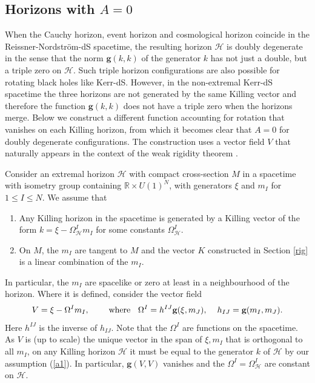 \documentclass[11pt, reqno]{amsart}
\newcommand{\R}{\mathbb{R}}
\theoremstyle{plain}
\theoremstyle{definition}
\numberwithin{equation}{section}
\begin{document}
\subsection{Horizons with \texorpdfstring{$A = 0$}{A = 0}}\label{ddhsec} When the Cauchy horizon, event horizon and cosmological horizon coincide in the Reissner-Nordström-dS spacetime, the resulting horizon $\mathcal{H}$ is doubly degenerate in the sense that the norm $\textbf{g}(k,k)$ of the generator $k$ has not just a double, but a triple zero on $\mathcal{H}$. Such triple horizon configurations are also possible for rotating black holes like Kerr-dS. However, in the non-extremal Kerr-dS spacetime the three horizons are not generated by the same Killing vector and therefore the function $\textbf{g}(k,k)$ does not have a triple zero when the horizons merge. Below we construct a different function accounting for rotation that vanishes on each Killing horizon, from which it becomes clear that $A = 0$ for doubly degenerate configurations. The construction uses a vector field $V$ that naturally appears in the context of the weak rigidity theorem \cite{C69, H96,CC08}.


Consider an extremal horizon $\mathcal{H}$ with compact cross-section $M$ in a spacetime with isometry group containing $\R \times U(1)^N$,  with generators $\xi$ and  $m_I$ for  $1 \leq I \leq N$. We assume that 
\begin{enumerate}
 \renewcommand{\labelenumi}{(A\arabic{enumi})}
  \renewcommand{\theenumi}{A\arabic{enumi}}
    \item Any Killing horizon in the spacetime is generated by a Killing vector of the form $k = \xi - \Omega^I_{\mathcal{H}}m_I$ for some constants $\Omega^I_{\mathcal{H}}$. \label{a1}
    \item \label{a2} On $M$, the $m_I$ are tangent to $M$ and the vector $K$ constructed in Section \ref{rig} is a linear combination of the $m_I$.
\end{enumerate}
In particular, the $m_I$ are spacelike or zero at least in a neighbourhood of the horizon. Where it is defined, consider the vector field
\begin{equation}  \label{Vdef}
    V = \xi - \Omega^I m_I, \hspace{.8cm} \text{where } \hspace{.2cm}\Omega^I = h^{IJ}\textbf{g}(\xi,m_J), \hspace{.4cm} h_{IJ} = \textbf{g}(m_I,m_J).
\end{equation}
Here $h^{IJ}$ is the inverse of $h_{IJ}$. Note that the $\Omega^I$ are functions on the spacetime. As $V$ is (up to scale) the unique vector in the span of $\xi,m_I$ that is orthogonal to all $m_I$, on any Killing horizon $\mathcal{H}$ it must be equal to the generator $k$ of $\mathcal{H}$ by our assumption (\ref{a1}). In particular, $\textbf{g}(V,V)$ vanishes and the $\Omega^I = \Omega^I_{\mathcal{H}}$ are constant on $\mathcal{H}$.
\end{document}
